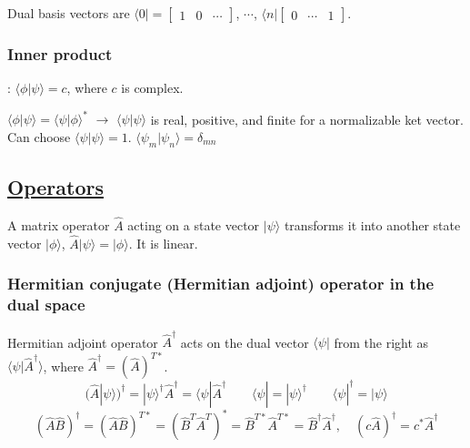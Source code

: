 Dual basis vectors are $\langle 0 | = \begin{bmatrix} 1 & 0 & \cdots \end{bmatrix}$, $\cdots$, $\langle n| \begin{bmatrix} 0 & \cdots & 1 \end{bmatrix}$.

\subsubsection{Inner product}: $\langle \phi | \psi \rangle = c$, where $c$ is complex.

$\langle \phi | \psi \rangle = \langle \psi | \phi \rangle^*$ $\rightarrow$ $\langle \psi | \psi \rangle$ is real, positive, and finite for a normalizable ket vector. Can choose $\langle \psi | \psi \rangle = 1$. $\langle \psi_m | \psi_n \rangle = \delta_{mn}$

\subsection{\underline{Operators}}
A matrix operator $\widehat{A}$ acting on a state vector $|\psi \rangle$ transforms it into another state vector $|\phi \rangle$, $\widehat{A} |\psi \rangle = | \phi \rangle$. It is linear.


\subsubsection{Hermitian conjugate (Hermitian adjoint) operator in the dual space} \hfill

Hermitian adjoint operator $\widehat{A}^{\dag}$ acts on the dual vector $\langle \psi |$ from the right as $\langle \psi | \widehat{A} ^{\dag} \rangle$, where $\widehat{A}^{\dag} = (\widehat{A})^{T*}$.
$$(\widehat{A} | \psi \rangle)^{\dag} = |\psi \rangle^{\dag} \widehat{A}^{\dag} = \langle \psi | \widehat{A}^{\dag} \qquad \langle \psi | = | \psi \rangle^{\dag} \qquad \langle \psi | ^{\dag} = | \psi \rangle$$
$$(\widehat{A}\widehat{B})^{\dag} = (\widehat{A} \widehat{B})^{T*} = (\widehat{B}^T \widehat{A}^T)^* = \widehat{B}^{T*} \widehat{A}^{T*} = \widehat{B}^{\dag} \widehat{A}^{\dag}, \quad (c\widehat{A})^{\dag} = c^* \widehat{A}^{\dag}$$

